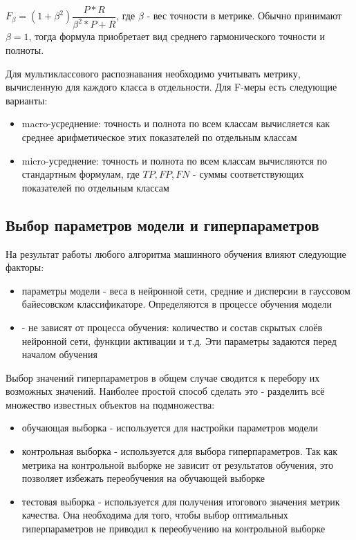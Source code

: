$F_\beta=(1+\beta^2)\dfrac{P*R}{\beta^2*P+R}$, где $\beta$ - вес точности в метрике. Обычно принимают $\beta=1$, тогда формула приобретает вид среднего гармонического точности и полноты. 

Для мультиклассового распознавания необходимо учитывать метрику, вычисленную для каждого класса в отдельности. Для F-меры есть следующие варианты\cite{sklearn_metric}:

\begin{itemize}
\item macro-усреднение: точность и полнота по всем классам вычисляется как среднее арифметическое этих показателей по отдельным классам
\item micro-усреднение: точность и полнота по всем классам вычисляются по стандартным формулам, где $TP, FP, FN$ - суммы соответствующих показателей по отдельным классам
\end{itemize}

\subsection{Выбор параметров модели и гиперпараметров}

На результат работы любого алгоритма машинного обучения влияют следующие факторы:

\begin{itemize}
\item параметры модели - веса в нейронной сети, средние и дисперсии в гауссовом байесовском классификаторе. Определяются в процессе обучения модели
\item {} - не зависят от процесса обучения: количество и состав скрытых слоёв нейронной сети, функции активации и т.д. Эти параметры задаются перед началом обучения
\end{itemize}

Выбор значений гиперпараметров в общем случае сводится к перебору их возможных значений. Наиболее простой способ сделать это - разделить всё множество известных объектов на подмножества:

\begin{itemize}
\item обучающая выборка - используется для настройки параметров модели
\item контрольная выборка - используется для выбора гиперпараметров. Так как метрика на контрольной выборке не зависит от результатов обучения, это позволяет избежать переобучения на обучающей выборке
\item тестовая выборка - используется для получения итогового значения метрик качества. Она необходима для того, чтобы выбор оптимальных гиперпараметров не приводил к переобучению на контрольной выборке
\end{itemize}

